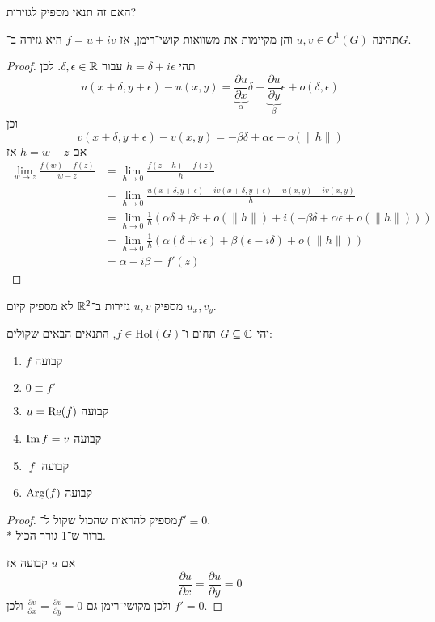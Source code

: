 האם זה תנאי מספיק לגזירות?
\begin{theorem}
	תהינה $u, v \in C^1(G)$ והן מקיימות את משוואות קושי־רימן, אז $f = u + i v$ היא גזירה ב־$G$.
\end{theorem}
\begin{proof}
	תהי $h = \delta + i \epsilon$ עבור $\delta, \epsilon \in \mathbb{R}$. לכן
	\[
		u(x + \delta, y + \epsilon) - u(x, y)
		= \underbrace{\frac{\partial u}{\partial x}}_{\alpha} \delta + \underbrace{\frac{\partial u}{\partial y}}_{\beta} \epsilon + o(\delta, \epsilon)
	\]
	וכן
	\[
		v(x + \delta, y + \epsilon) - v(x, y)
		= - \beta \delta + \alpha \epsilon + o(\lVert h \rVert)
	\]
	אם $h = w - z$ אז
	\begin{align*}
		\lim_{w \to z} \frac{f(w) - f(z)}{w - z}
		& = \lim_{h \to 0} \frac{f(z + h) - f(z)}{h} \\
		& = \lim_{h \to 0} \frac{u(x + \delta, y + \epsilon) + i v(x + \delta, y + \epsilon) - u(x, y) - i v(x, y)}{h} \\
		& = \lim_{h \to 0} \frac{1}{h} (\alpha \delta + \beta \epsilon + o(\lVert h \rVert) + i(-\beta \delta + \alpha \epsilon + o(\lVert h \rVert))) \\
		& = \lim_{h \to 0} \frac{1}{h} (\alpha(\delta + i \epsilon) + \beta(\epsilon - i \delta) + o(\lVert h \rVert)) \\
		& = \alpha - i \beta = f'(z)
	\end{align*}
\end{proof}
\begin{remark}
	מספיק $u, v$ גזירות ב־$\mathbb{R}^2$ לא מספיק קיום $u_x, v_y$.
\end{remark}
\begin{theorem}
	יהי $G \subseteq \mathbb{C}$ תחום ו־$f \in \text{Hol}(G)$, התנאים הבאים שקולים:
	\begin{enumerate}
		\item $f$ קבועה
		\item $0 \equiv f'$
		\item $u = \operatorname{Re}(f)$ קבועה
		\item $\operatorname{Im} f = v$ קבועה
		\item $|f|$ קבועה
		\item $\operatorname{Arg}(f)$ קבועה
	\end{enumerate}
\end{theorem}
\begin{proof}
	מספיק להראות שהכול שקול ל־$f' \equiv 0$. \\*
	ברור ש־1 גורר הכול.

	אם $u$ קבועה אז
	\[
		\frac{\partial u}{\partial x} = \frac{\partial u}{\partial y} = 0
	\]
	ולכן מקושי־רימן גם $\frac{\partial v}{\partial x} = \frac{\partial v}{\partial y} = 0$ ולכן $f' = 0$.
\end{proof}

